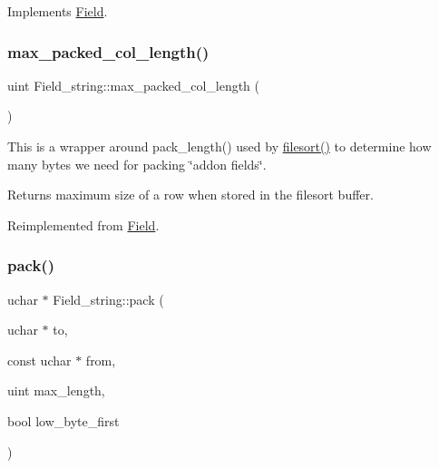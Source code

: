 Implements \mbox{\hyperlink{classField_af3bc27d237b6ae6ef3dc7a2aec3d79ac}{Field}}.

\mbox{\label{classField__string_aefd90b60a7e413fd914d1eb481ed4545}} 
\subsubsection{\texorpdfstring{max\+\_\+packed\+\_\+col\+\_\+length()}{max\_packed\_col\_length()}}
{\footnotesize\ttfamily uint Field\+\_\+string\+::max\+\_\+packed\+\_\+col\+\_\+length (\begin{DoxyParamCaption}{ }\end{DoxyParamCaption})\hspace{0.3cm}{\ttfamily [virtual]}}

This is a wrapper around pack\+\_\+length() used by \mbox{\hyperlink{filesort_8cc_a953fde8362f86f7fb832e9a1e2c06530}{filesort()}} to determine how many bytes we need for packing \char`\"{}addon fields\char`\"{}. \begin{DoxyReturn}{Returns}
maximum size of a row when stored in the filesort buffer. 
\end{DoxyReturn}


Reimplemented from \mbox{\hyperlink{classField_a05d15db9879fe9ae68415819b3dbf96f}{Field}}.

\mbox{\label{classField__string_a2394757ed93148a4ad7199e93ace382b}} 
\subsubsection{\texorpdfstring{pack()}{pack()}}
{\footnotesize\ttfamily uchar $\ast$ Field\+\_\+string\+::pack (\begin{DoxyParamCaption}\item[{uchar $\ast$}]{to,  }\item[{const uchar $\ast$}]{from,  }\item[{uint}]{max\+\_\+length,  }\item[{bool}]{low\+\_\+byte\+\_\+first }\end{DoxyParamCaption})\hspace{0.3cm}{\ttfamily [virtual]}}

